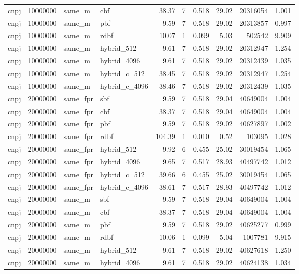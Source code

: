 \begin{tabular}{llllrrrrrr}
cnpj & 10000000 & same\_m & cbf & 38.37 & 7 & 0.518 & 29.02 & 20316054 & 1.001 \\
cnpj & 10000000 & same\_m & pbf & 9.59 & 7 & 0.518 & 29.02 & 20313857 & 0.997 \\
cnpj & 10000000 & same\_m & rdbf & 10.07 & 1 & 0.099 & 5.03 & 502542 & 9.909 \\
cnpj & 10000000 & same\_m & hybrid\_512 & 9.61 & 7 & 0.518 & 29.02 & 20312947 & 1.254 \\
cnpj & 10000000 & same\_m & hybrid\_4096 & 9.61 & 7 & 0.518 & 29.02 & 20312439 & 1.035 \\
cnpj & 10000000 & same\_m & hybrid\_c\_512 & 38.45 & 7 & 0.518 & 29.02 & 20312947 & 1.254 \\
cnpj & 10000000 & same\_m & hybrid\_c\_4096 & 38.46 & 7 & 0.518 & 29.02 & 20312439 & 1.035 \\
cnpj & 20000000 & same\_fpr & sbf & 9.59 & 7 & 0.518 & 29.04 & 40649004 & 1.004 \\
cnpj & 20000000 & same\_fpr & cbf & 38.37 & 7 & 0.518 & 29.04 & 40649004 & 1.004 \\
cnpj & 20000000 & same\_fpr & pbf & 9.59 & 7 & 0.518 & 29.02 & 40627897 & 1.002 \\
cnpj & 20000000 & same\_fpr & rdbf & 104.39 & 1 & 0.010 & 0.52 & 103095 & 1.028 \\
cnpj & 20000000 & same\_fpr & hybrid\_512 & 9.92 & 6 & 0.455 & 25.02 & 30019454 & 1.065 \\
cnpj & 20000000 & same\_fpr & hybrid\_4096 & 9.65 & 7 & 0.517 & 28.93 & 40497742 & 1.012 \\
cnpj & 20000000 & same\_fpr & hybrid\_c\_512 & 39.66 & 6 & 0.455 & 25.02 & 30019454 & 1.065 \\
cnpj & 20000000 & same\_fpr & hybrid\_c\_4096 & 38.61 & 7 & 0.517 & 28.93 & 40497742 & 1.012 \\
cnpj & 20000000 & same\_m & sbf & 9.59 & 7 & 0.518 & 29.04 & 40649004 & 1.004 \\
cnpj & 20000000 & same\_m & cbf & 38.37 & 7 & 0.518 & 29.04 & 40649004 & 1.004 \\
cnpj & 20000000 & same\_m & pbf & 9.59 & 7 & 0.518 & 29.02 & 40625277 & 0.999 \\
cnpj & 20000000 & same\_m & rdbf & 10.06 & 1 & 0.099 & 5.04 & 1007781 & 9.915 \\
cnpj & 20000000 & same\_m & hybrid\_512 & 9.61 & 7 & 0.518 & 29.02 & 40627618 & 1.250 \\
cnpj & 20000000 & same\_m & hybrid\_4096 & 9.61 & 7 & 0.518 & 29.02 & 40624138 & 1.034 \\

\end{tabular}
